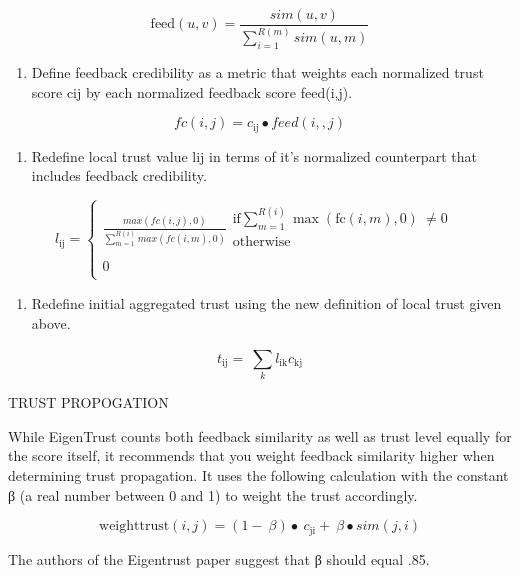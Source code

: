 \[\text{feed}\left( u,v \right) = \frac{sim(u,v)}{\sum_{i = 1}^{R(m)}{sim(u,m)}}\]

\begin{enumerate}
\def\labelenumi{\arabic{enumi}.}
\item
  Define feedback credibility as a metric that weights each normalized
  trust score cij by each normalized feedback score feed(i,j).
\end{enumerate}

\[fc(i,j) = c_{\text{ij}} \bullet feed(i,,j)\]

\begin{enumerate}
\def\labelenumi{\arabic{enumi}.}
\item
  Redefine local trust value lij in terms of it's normalized counterpart
  that includes feedback credibility.
\end{enumerate}

\[l_{\text{ij}} = \left\{ \begin{matrix}
\frac{max(fc\left( i,j \right),0)}{\sum_{m = 1}^{R(i)}{max(fc\left( i,m \right),0)}}\begin{matrix}
\text{if}\sum_{m = 1}^{R(i)}{\max{\left( \text{fc}\left( i,m \right),0 \right)\  \neq 0}}\  \\
\text{otherwise} \\
\end{matrix} \\
0 \\
\end{matrix} \right.\ \]

\begin{enumerate}
\def\labelenumi{\arabic{enumi}.}
\item
  Redefine initial aggregated trust using the new definition of local
  trust given above.
\end{enumerate}

\[t_{\text{ij}} = \ \sum_{k}^{}l_{\text{ik}}c_{\text{kj}}\]

TRUST PROPOGATION

While EigenTrust counts both feedback similarity as well as trust level
equally for the score itself, it recommends that you weight feedback
similarity higher when determining trust propagation. It uses the
following calculation with the constant β (a real number between 0 and
1) to weight the trust accordingly.

\[\text{weighttrust}\left( i,j \right) = \left( 1 - \ \beta \right) \bullet \ c_{\text{ji}} + \ \beta \bullet sim(j,i)\]

The authors of the Eigentrust paper suggest that β should equal .85.

